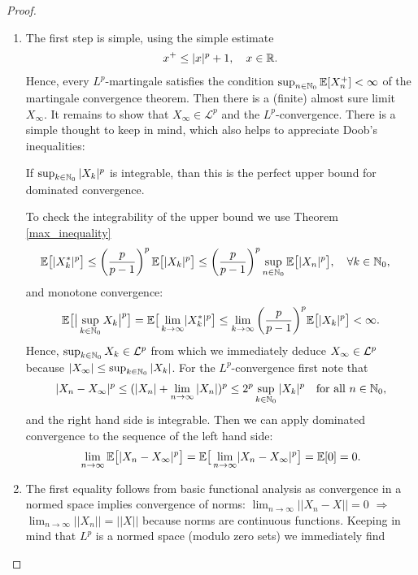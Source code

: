 \begin{proof}[Proof]
\begin{enumerate}[label=(\roman*)]
	\item The first step is simple, using the simple estimate
	\begin{align*}
		x^+ \leq \lvert x \rvert^p + 1,\quad x\in\mathbb{R}.
	\end{align*}		
	Hence, every $L^p$-martingale satisfies the condition $\sup_{n\in\mathbb{N}_0} \mathbb{E}[X_n^+]<\infty$ of the martingale convergence theorem. Then there is a (finite) almost sure limit $X_{\infty}$. It remains to show that $X_\infty \in \mathcal L^p$ and the $L^p$-convergence. There is a simple thought to keep in mind, which also helps to appreciate Doob's inequalities:
	\begin{lstep}
		If $\sup_{k\in\mathbb{N}_0}|X_k|^p$ is integrable, than this is the perfect upper bound for dominated convergence. 
	\end{lstep}
	To check the integrability of the upper bound we use Theorem \ref{max_inequality}
	\begin{align*}
		\mathbb{E}\big[\lvert X_k^* \rvert^p\big] &\leq \left(\frac{p}{p-1}\right)^p \mathbb{E}\big[\lvert X_k\rvert^p\big] 
										\leq \left(\frac{p}{p-1}\right)^p \sup\limits_{n\in\mathbb{N}_0} \mathbb{E}\big[\lvert X_n\rvert^p\big],\quad \forall k\in \mathbb{N}_0,
	\end{align*}
	and monotone convergence:
	\begin{align*}
		\mathbb{E}\big[\big| \sup_{k\in \mathbb{N}_0} X_k\big|^p\big] = \mathbb{E}\big[\lim\limits_{k\to\infty}\lvert X_k^*\rvert^p\big]
										\leq \lim_{k\to\infty} \bigg(\frac{p}{p-1}\bigg)^p \mathbb{E}\big[\lvert X_k\rvert^p\big] < \infty.
	\end{align*}
	Hence, $\sup_{k\in \mathbb{N}_0} X_k\in \mathcal{L}^p$ from which we immediately deduce $X_\infty \in \mathcal{L}^p$ because $|X_\infty|\leq \sup_{k\in\mathbb{N}_0}|X_k|$. For the $L^p$-convergence first note that
	\begin{align*}
		\lvert X_n - X_{\infty} \rvert^p \leq (|X_n| +\lim_{n\to\infty} |X_n|)^p\leq  2^p \sup_{k\in \mathbb{N}_0} |X_k|^p\quad \text{for all } n\in \mathbb N_0,
	\end{align*}	
	and the right hand side is integrable. Then we can apply dominated convergence to the sequence of the left hand side:
	\begin{align*}
		\lim_{n\to \infty} \mathbb{E}\big[\lvert X_n - X_{\infty}\rvert^p\big] = \mathbb{E}\big[\lim_{n\to\infty}\lvert X_n - X_{\infty}\rvert^p\big] = \mathbb{E}[0] = 0.
	\end{align*}
	\item The first equality follows from basic functional analysis as convergence in a normed space implies convergence of norms: $\lim_{n\to\infty} ||X_n-X||= 0$ $\Rightarrow$ $\lim_{n\to\infty} ||X_n||=||X||$ because norms are continuous functions. Keeping in mind that $L^p$ is a normed space (modulo zero sets) we immediately find 

\end{enumerate}
\end{proof}
